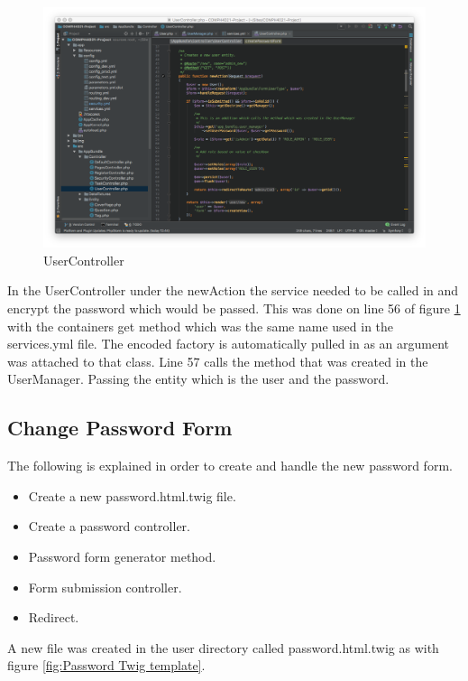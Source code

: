 \begin{figure}[htbp]
   \centering
   \includegraphics[width=400pt]{figures/user_controller.png} %
   \caption{UserController}
   \label{fig:UserController}
\end{figure}

In the UserController under the newAction the service needed to be called in and encrypt the password which would be passed. This was done on line 56 of figure \ref{fig:UserController} with the containers get method which was the same name used in the services.yml file. The encoded factory is automatically pulled in as an argument was attached to that class. Line 57 calls the method that was created in the UserManager. Passing the entity which is the user and the password.

\subsection{Change Password Form}

The following is explained in order to create and handle the new password form.

\begin{itemize}
  \item Create a new password.html.twig file.
    \item Create a password controller.
      \item Password form generator method.
        \item Form submission controller.
          \item Redirect.
\end{itemize}

A new file was created in the user directory called password.html.twig as with figure \ref{fig:Password Twig template}.

